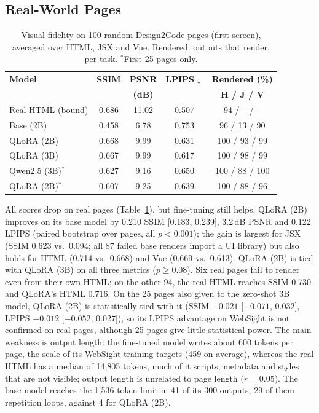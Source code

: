 \documentclass[conference,a4paper]{IEEEtran}
\begin{document}
\subsection{Real-World Pages}
\label{subsec:d2c}

\begin{table}[t]
\centering
\caption{Visual fidelity on 100 random Design2Code pages (first screen), averaged over HTML, JSX and Vue. Rendered: outputs that render, per task. $^*$First 25 pages only.}
\label{tab:d2c}
\footnotesize
\setlength{\tabcolsep}{3.5pt}
\renewcommand{\arraystretch}{1.1}
\begin{tabular}{lcccc}
\hline
\textbf{Model} & \textbf{SSIM} & \textbf{PSNR} & \textbf{LPIPS}$\downarrow$ & \textbf{Rendered (\%)} \\
 & & \textbf{(dB)} & & \textbf{H / J / V} \\
\hline
Real HTML (bound) & 0.686 & 11.02 & 0.507 & 94 / -- / -- \\
Base (2B) & 0.458 & 6.78 & 0.753 & 96 / 13 / 90 \\
QLoRA (2B) & 0.668 & 9.99 & 0.631 & 100 / 93 / 99 \\
QLoRA (3B) & 0.667 & 9.99 & 0.617 & 100 / 98 / 99 \\
\hline
Qwen2.5 (3B)$^*$ & 0.627 & 9.16 & 0.650 & 100 / 88 / 100 \\
QLoRA (2B)$^*$ & 0.607 & 9.25 & 0.639 & 100 / 88 / 96 \\
\hline
\end{tabular}
\end{table}

All scores drop on real pages (Table~\ref{tab:d2c}), but fine-tuning still helps. QLoRA (2B) improves on its base model by 0.210 SSIM [0.183, 0.239], 3.2\,dB PSNR and 0.122 LPIPS (paired bootstrap over pages, all $p<0.001$); the gain is largest for JSX (SSIM 0.623 vs.\ 0.094; all 87 failed base renders import a UI library) but also holds for HTML (0.714 vs.\ 0.668) and Vue (0.669 vs.\ 0.613). QLoRA (2B) is tied with QLoRA (3B) on all three metrics ($p \ge 0.08$). Six real pages fail to render even from their own HTML; on the other 94, the real HTML reaches SSIM 0.730 and QLoRA's HTML 0.716. On the 25 pages also given to the zero-shot 3B model, QLoRA (2B) is statistically tied with it (SSIM $-0.021$ [$-0.071$, 0.032], LPIPS $-0.012$ [$-0.052$, 0.027]), so its LPIPS advantage on WebSight is not confirmed on real pages, although 25 pages give little statistical power. The main weakness is output length: the fine-tuned model writes about 600 tokens per page, the scale of its WebSight training targets (459 on average), whereas the real HTML has a median of 14,805 tokens, much of it scripts, metadata and styles that are not visible; output length is unrelated to page length ($r=0.05$). The base model reaches the 1,536-token limit in 41 of its 300 outputs, 29 of them repetition loops, against 4 for QLoRA (2B).
\end{document}
